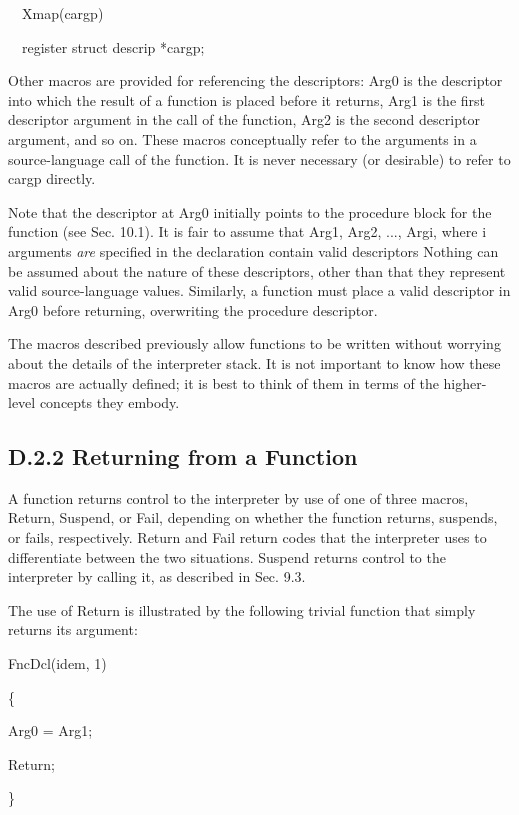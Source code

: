 {\ttfamily\mdseries
\ \ Xmap(cargp)}

{\ttfamily\mdseries
\ \ register struct descrip *cargp;}


Other macros are provided for referencing the descriptors: Arg0 is the descriptor into which the result of a function is
placed before it returns, Arg1 is the first descriptor argument in the call of the function, Arg2 is the second
descriptor argument, and so on. These macros conceptually refer to the arguments in a source-language call of the
function. It is never necessary (or desirable) to refer to cargp directly.


Note that the descriptor at Arg0 initially points to the procedure
block for the function (see Sec. 10.1). It is fair to assume that
Arg1, Arg2, ..., Argi, where i arguments \textit{are} specified in the
declaration contain valid descriptors Nothing can be assumed about the
nature of these descriptors, other than that they represent valid
source-language values. Similarly, a function must place a valid
descriptor in Arg0 before returning, overwriting the procedure
descriptor.

The macros described previously allow functions to be written without
worrying about the details of the interpreter stack. It is not
important to know how these macros are actually defined; it is best to
think of them in terms of the higher-level concepts they embody.

\subsection[D.2.2 Returning from a Function]{D.2.2 Returning from a Function}

A function returns control to the interpreter by use of one of three
macros, Return, Suspend, or Fail, depending on whether the function
returns, suspends, or fails, respectively. Return and Fail return
codes that the interpreter uses to differentiate between the two
situations. Suspend returns control to the interpreter by calling it,
as described in Sec. 9.3.

The use of Return is illustrated by the following trivial function
that simply returns its argument:

{\ttfamily\mdseries
FncDcl(idem, 1)}

{\ttfamily\mdseries
\{}

{\ttfamily\mdseries
Arg0 = Arg1;}

{\ttfamily\mdseries
Return;}

{\ttfamily\mdseries
\}}



